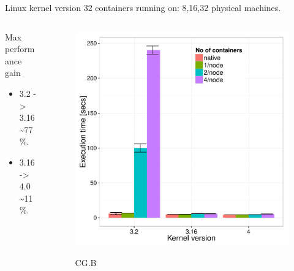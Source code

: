 \documentclass[presentation]{beamer}
\begin{document}
\begin{frame}[label=sec-3-3]{Linux kernel version}
32 containers running on: 8,16,32 physical machines.

\begin{columns}
\begin{column}{0.5\textwidth}
\begin{block}{Max performance gain}


\begin{itemize}
\item 3.2 -> 3.16 \textasciitilde{}77\%.
\item 3.16 -> 4.0 \textasciitilde{}11\%.
\end{itemize}
\end{block}
\end{column}

\begin{column}{0.5\textwidth}





\begin{figure}[!h]
  \center
  \includegraphics[scale=0.32]{figures/execution_time-kernel-cgB.pdf}
  \label{fig:hpc}
  \caption{CG.B}
\end{figure}
\end{column}
\end{columns}
\end{frame}
\end{document}
